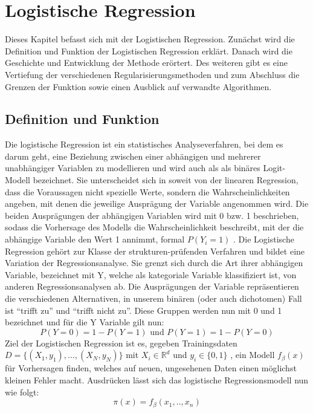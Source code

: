 \chapter{Logistische Regression}
Dieses Kapitel befasst sich mit der Logistischen Regression. Zunächst wird die Definition und Funktion der Logistischen Regression erklärt. Danach wird die Geschichte und Entwicklung der Methode erörtert. Des weiteren gibt es eine Vertiefung der verschiedenen Regularisierungsmethoden und zum Abschluss die Grenzen der Funktion sowie einen Ausblick auf verwandte Algorithmen.
\section{Definition und Funktion}
Die logistische Regression ist ein statistisches Analyseverfahren, bei dem es darum geht, eine Beziehung zwischen einer abhängigen und mehrerer unabhängiger Variablen zu modellieren und wird auch als als binäres Logit-Modell bezeichnet.
Sie unterscheidet sich in soweit von der linearen Regression, dass die Voraussagen nicht spezielle Werte, sondern die Wahrscheinlichkeiten angeben, mit denen die jeweilige Ausprägung der Variable angenommen wird.\cite{ROHR} Die beiden Ausprägungen der abhängigen Variablen wird mit 0 bzw. 1 beschrieben, sodass die Vorhersage des Modells die Wahrscheinlichkeit beschreibt, mit der die abhängige Variable den Wert 1 annimmt, formal $P(Y_i=1)$ . Die Logistische Regression gehört zur Klasse der strukturen-prüfenden Verfahren und bildet eine Variation der Regressionsanalyse. Sie grenzt sich durch die Art ihrer abhängigen Variable, bezeichnet mit Y, welche als kategoriale Variable klassifiziert ist, von anderen Regressionsanalysen ab. Die Ausprägungen der Variable repräsentieren die verschiedenen Alternativen, in unserem binären (oder auch dichotomen) Fall ist "`trifft zu"' und "`trifft nicht zu"'.\cite{BECK}
Diese Gruppen werden nun mit 0 und 1 bezeichnet und für die Y Variable gilt nun: 
\begin{displaymath}
P(Y=0)=1-P(Y=1)\text{ und } P(Y=1)=1-P(Y=0)
\end{displaymath}
Ziel der Logistischen Regression ist es, gegeben Trainingsdaten 
$D = \{(X_1, y_1), \dots, (X_N,y_N)\}$ mit $X_i \in \mathbb R^d$ und $y_i \in 
\{0,1\}$ , ein Modell $f_{\beta}(x)$ für Vorhersagen finden, 
welches auf neuen, ungesehenen Daten einen möglichst kleinen Fehler macht.
Ausdrücken lässt sich das logistische Regressionsmodell nun wie folgt:
\begin{displaymath}
\pi(x) = f_{\beta}(x_{1},..,x_{n})
\end{displaymath}
